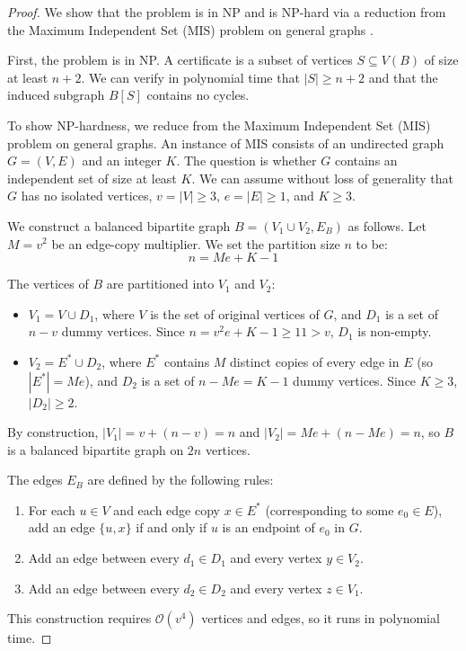 \documentclass[a4paper]{amsart}
\begin{document}
\begin{proof}
    We show that the problem is in NP and is NP-hard via a reduction from the Maximum Independent Set (MIS) problem on general graphs \cite{Karp1972}.
    
    First, the problem is in NP. A certificate is a subset of vertices $S \subseteq V(B)$ of size at least $n+2$. We can verify in polynomial time that $|S| \ge n+2$ and that the induced subgraph $B[S]$ contains no cycles.
    
    To show NP-hardness, we reduce from the Maximum Independent Set (MIS) problem on general graphs. An instance of MIS consists of an undirected graph $G = (V, E)$ and an integer $K$. The question is whether $G$ contains an independent set of size at least $K$. We can assume without loss of generality that $G$ has no isolated vertices, $v = |V| \ge 3$, $e = |E| \ge 1$, and $K \ge 3$.
    
    We construct a balanced bipartite graph $B = (V_1 \cup V_2, E_B)$ as follows. Let $M = v^2$ be an edge-copy multiplier. We set the partition size $n$ to be:
    \[ n = M e + K - 1 \]
    
    The vertices of $B$ are partitioned into $V_1$ and $V_2$:
    \begin{itemize}
        \item $V_1 = V \cup D_1$, where $V$ is the set of original vertices of $G$, and $D_1$ is a set of $n - v$ dummy vertices. Since $n = v^2 e + K - 1 \ge 11 > v$, $D_1$ is non-empty.
        \item $V_2 = E^* \cup D_2$, where $E^*$ contains $M$ distinct copies of every edge in $E$ (so $|E^*| = M e$), and $D_2$ is a set of $n - M e = K - 1$ dummy vertices. Since $K \ge 3$, $|D_2| \ge 2$.
    \end{itemize}
    By construction, $|V_1| = v + (n-v) = n$ and $|V_2| = M e + (n-M e) = n$, so $B$ is a balanced bipartite graph on $2n$ vertices.
    
    The edges $E_B$ are defined by the following rules:
    \begin{enumerate}
        \item For each $u \in V$ and each edge copy $x \in E^*$ (corresponding to some $e_0 \in E$), add an edge $\{u, x\}$ if and only if $u$ is an endpoint of $e_0$ in $G$.
        \item Add an edge between every $d_1 \in D_1$ and every vertex $y \in V_2$.
        \item Add an edge between every $d_2 \in D_2$ and every vertex $z \in V_1$.
    \end{enumerate}
    This construction requires $\mathcal{O}(v^4)$ vertices and edges, so it runs in polynomial time.
    

\end{proof}
\end{document}
